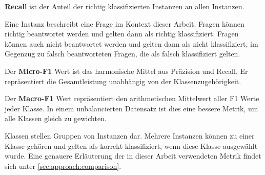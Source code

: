 \begin{definition}
    \textbf{Recall} ist der Anteil der richtig klassifizierten Instanzen an allen Instanzen.
\end{definition}
Eine Instanz beschreibt eine Frage im Kontext dieser Arbeit. Fragen können richtig beantwortet werden und gelten dann als richtig klassifiziert.
Fragen können auch nicht beantwortet werden und gelten dann als nicht klassifiziert, im Gegenzug zu falsch beantworteten Fragen, die als falsch klassifiziert gelten.\\

\begin{definition}\label{def:micro-f1}
    Der \textbf{Micro-F1} Wert ist das harmonische Mittel aus Präzision und Recall.
    Er repräsentiert die Gesamtleistung unabhängig von der Klassenzugehörigkeit.
\end{definition}

\begin{definition}\label{def:macro-f1}
    Der \textbf{Macro-F1} Wert repräsentiert den arithmetischen Mittelwert aller F1 Werte jeder Klasse.
    In einem unbalancierten Datensatz ist dies eine bessere Metrik, um alle Klassen gleich zu gewichten.
\end{definition}

Klassen stellen Gruppen von Instanzen dar. Mehrere Instanzen können zu einer Klasse gehören und gelten als korrekt klassifiziert, wenn diese Klasse ausgewählt wurde.
Eine genauere Erläuterung der in dieser Arbeit verwendeten Metrik findet sich unter \cref{sec:approach:comparison}.
